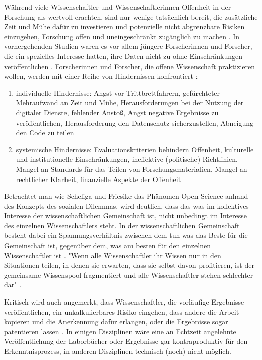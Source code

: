 Während viele Wissenschaftler und Wissenschaftlerinnen Offenheit in der Forschung als wertvoll erachten, sind nur wenige tatsächlich bereit, die zusätzliche Zeit und Mühe dafür zu investieren und potenzielle nicht abgrenzbare Risiken einzugehen, Forschung offen und uneingeschränkt zugänglich zu machen \cite{Scheliga_2014} \cite{Tenopir_2011} \cite{Procter_2010}. In vorhergehenden Studien waren es vor allem jüngere Forscherinnen und Forscher, die ein spezielles Interesse hatten, ihre Daten nicht zu ohne Einschränkungen veröffentlichen \cite{Tenopir_2011}. Forscherinnen und Forscher, die offene Wissenschaft praktizieren wollen, werden mit einer Reihe von Hindernissen konfrontiert \cite{Scheliga_2014}:
\begin{enumerate}
\item individuelle Hindernisse: Angst vor Trittbrettfahrern, gefürchteter Mehraufwand an Zeit und Mühe, Herausforderungen bei der Nutzung der digitaler Dienste, fehlender Anstoß, Angst negative Ergebnisse zu veröffentlichen, Herausforderung den Datenschutz sicherzustellen, Abneigung den Code zu teilen
\item systemische Hindernisse: Evaluationskriterien behindern Offenheit, kulturelle und institutionelle Einschränkungen, ineffektive (politische) Richtlinien, Mangel an Standards für das Teilen von Forschungsmaterialien, Mangel an rechtlicher Klarheit, finanzielle Aspekte der Offenheit
\end{enumerate}

Betrachtet man wie Scheliga und Friesike das Phänomen Open Science anhand des Konzepts des sozialen Dilemmas, wird deutlich, dass das was im kollektives Interesse der wissenschaftlichen Gemeinschaft ist, nicht unbedingt im Interesse des einzelnen Wissenschaftlers steht. In der wissenschaftlichen Gemeinschaft besteht dabei ein Spannungsverhältnis zwischen dem tun was das Beste für die Gemeinschaft ist, gegenüber dem, was am besten für den einzelnen Wissenschaftler ist \cite{Ekins_2014} \cite{patlak_2010_open} \cite{wein_2010_erwerbung}. "Wenn alle Wissenschaftler ihr Wissen nur in den Situationen teilen, in denen sie erwarten, dass sie selbst davon profitieren, ist der gemeinsame Wissenspool fragmentiert und alle Wissenschaftler stehen schlechter dar" \cite{Scheliga_2014}.

Kritisch wird auch angemerkt, dass Wissenschaftler, die vorläufige Ergebnisse veröffentlichen, ein unkalkulierbares Risiko eingehen, dass andere die Arbeit kopieren und die Anerkennung dafür erlangen, oder die Ergebnisse sogar patentieren lassen \cite{Peters_2014}. In einigen Disziplinen wäre eine an Echtzeit angelehnte Veröffentlichung der Laborbücher oder Ergebnisse gar kontraproduktiv für den Erkenntnisprozess, in anderen Disziplinen technisch (noch) nicht möglich.

